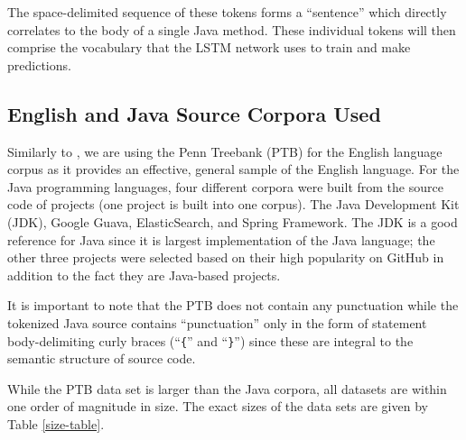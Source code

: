 \documentclass[runningheads,a4paper]{llncs}
\begin{document}

The space-delimited sequence of these tokens forms a ``sentence'' which  
directly  correlates to the body of a single Java method. These individual  
tokens will then comprise the vocabulary that the LSTM network uses to train 
and make predictions.

\subsection{English and Java Source Corpora Used}

Similarly to \citet{LSTMArticle}, we are using the Penn Treebank (PTB) for the
English language corpus as it provides an effective, general sample of the English
language. %
For the Java programming languages, four different corpora were built from
the source code of projects (one project is built into one corpus). The
Java Development Kit (JDK), Google Guava, ElasticSearch, and Spring Framework.
The JDK is a good reference for Java since it is largest implementation
of the Java language; the other three projects were selected based on their
high popularity on GitHub in addition to the fact they are
Java-based projects.

It is important to note that the
PTB does not contain any punctuation while the tokenized
Java source contains ``punctuation'' only in the form of statement
body-delimiting curly braces (``\texttt\{'' and ``\texttt\}'')
since these are integral to the semantic structure of source code.


While the PTB data set is larger than the Java corpora, all datasets
are within one order of magnitude in size. The exact sizes of the
data sets are given by Table \ref{size-table}.
\end{document}

